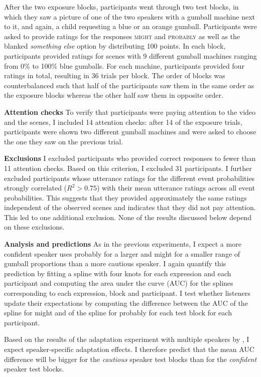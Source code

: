  After the two exposure blocks, participants went through two test blocks, in which they saw a picture of one of the two speakers with a gumball machine next to it, and again, a child requesting a blue or an orange gumball. Participants were asked to provide ratings for the responses \textsc{might} and \textsc{probably} as well as the blanked \textit{something else} option by distributing 100 points.   In each block, participants provided ratings for scenes with 9 different gumball machines ranging from 0\% to 100\% blue gumballs. For each machine, participants provided four ratings in total, resulting in 36 trials per block. The order of blocks was counterbalanced such that half of the participants saw them in the same order as the exposure blocks whereas the other half saw them in opposite order.

\noindent \textbf{Attention checks}  To verify that participants were paying attention to the video and the scenes, I included 14 attention checks: after 14 of the exposure trials, participants were shown two different gumball machines and were asked to choose the one they saw on the previous trial. 

\noindent \textbf{Exclusions} I excluded participants who provided correct responses to fewer than 11 attention checks. Based on this criterion, I excluded 31 participants. I further excluded participants whose utterance ratings for the different event probabilities strongly correlated ($R^2 > 0.75$) with their mean utterance ratings across all event probabilities. This suggests that they provided approximately the same ratings independent of the observed scenes and indicates that they did not pay attention. This led to one additional exclusion. None of the results discussed below depend on these exclusions.

\noindent \textbf{Analysis and predictions} 
As in the previous experiments, I expect a more confident speaker uses {\sc probably} for a larger and {\sc might} 
for a smaller range of gumball proportions than a more cautious speaker. I again quantify this prediction by 
fitting a spline with four knots for each 
expression and each participant and computing the area under the curve (AUC) for the splines 
corresponding to each expression, block and participant. 
I test whether listeners update their expectations by computing the difference between 
the AUC of the spline for {\sc might} and of the spline for {\sc probably} for each test block for each 
participant. 

Based on the results of the adaptation experiment with multiple speakers by \textcite{Yildirim2016},
I expect speaker-specific adaptation effects. I therefore predict that the mean AUC difference
will be bigger for the \emph{cautious} speaker test blocks than for the \emph{confident} speaker test blocks.

